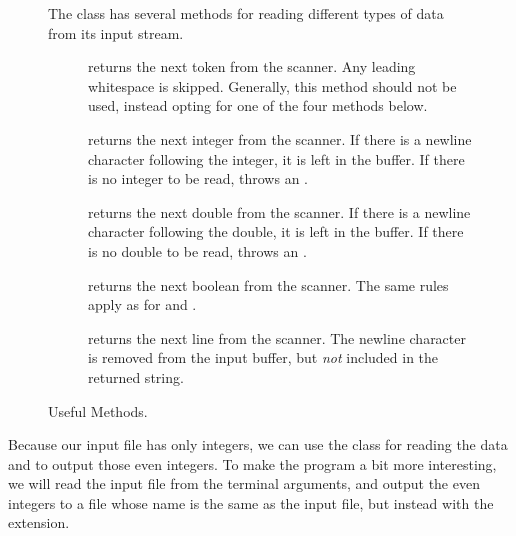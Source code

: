 \begin{figure}[tp]
  \small
  \begin{tcolorbox}[title=Scanner Methods]
    The  class has several methods for reading different types of data from its input stream.
    \vspace{2ex}
  \begin{description}
    \item [] returns the next token from the scanner. Any leading whitespace is skipped. Generally, this method should not be used, instead opting for one of the four methods below.
    \item [] returns the next integer from the scanner. If there is a newline character following the integer, it is left in the buffer. If there is no integer to be read, throws an . 
    \item [] returns the next double from the scanner. If there is a newline character following the double, it is left in the buffer. If there is no double to be read, throws an .
    \item [] returns the next boolean from the scanner. The same rules apply as for  and .
    \item [] returns the next line from the scanner. The newline character is removed from the input buffer, but \emph{not} included in the returned string. 
  \end{description}
\end{tcolorbox}
  \caption{Useful  Methods.}
  \label{fig:scin}
\end{figure}

Because our input file has only integers, we can use the  class for reading the data and  to output those even integers. 
To make the program a bit more interesting, we will read the input file from the terminal arguments, and output the even integers to a file whose name is the same as the input file, but instead with the  extension.

